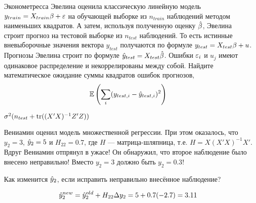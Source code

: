 \begin{problem}
	Эконометресса Эвелина оценила классическую линейную модель $y_{train}=X_{train}\beta + \varepsilon$ на обучающей выборке из $n_{train}$ наблюдений методом наименьших квадратов.
	А затем, используя полученную оценку $\hat{\beta}$, Эвелина строит прогноз на тестовой выборке из $n_{test}$ наблюдений.
То есть истинные вневыборочные значения вектора $y_{test}$ получаются по формуле $y_{test}=X_{test}\beta + u$.
	Прогнозы Эвелина строит по формуле $\hat y_{test} = X_{test}\hat{\beta}$.
Ошибки $\varepsilon_i$ и $u_j$ имеют одинаковое распределение и некоррелированы между собой.
Найдите математическое ожидание суммы квадратов ошибок прогнозов,
\[
	\mathbb{E}\left(  \sum_i (y_{test,i} - \hat y_{test,i})^2  \right)
\]


\begin{sol}
	$\sigma^2( n_{test}  + \operatorname{tr}((X'X)^{-1}Z'Z))$
\end{sol}
\end{problem}


\begin{problem}
Вениамин оценил модель множественной регрессии. При этом оказалось, что $y_2=3$, $\hat{y}_2=5$ и $H_{22}=0.7$, где $H$ — матрица-шляпница, т.е. $H=X(X'X)^{-1}X'$. Вдруг Вениамин отпрянул в ужасе! Он обнаружил, что второе наблюдение было внесено неправильно! Вместо $y_2=3$ должно быть $y_2=0.3$!

Как изменится $\hat{y}_2$, если исправить неправильно внесённое наблюдение?
\begin{sol}
\[
\hat{y}_2^{new} = \hat{y}_2^{old} + H_{22} \Delta y_2 = 5 + 0.7(-2.7) = 3.11
\]
\end{sol}
\end{problem}



